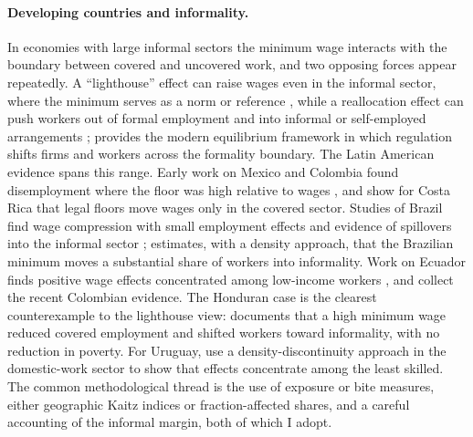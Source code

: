 \paragraph{Developing countries and informality.} In economies with large informal sectors the minimum wage interacts with the boundary between covered and uncovered work, and two opposing forces appear repeatedly. A ``lighthouse'' effect can raise wages even in the informal sector, where the minimum serves as a norm or reference \citep{lemos_2009, bosch_manacorda_2010, maloney_nunez_2004}, while a reallocation effect can push workers out of formal employment and into informal or self-employed arrangements \citep{ham_2018_honduras}; \citet{ulyssea_2018} provides the modern equilibrium framework in which regulation shifts firms and workers across the formality boundary. The Latin American evidence spans this range. Early work on Mexico and Colombia found disemployment where the floor was high relative to wages \citep{bell_1997}, and \citet{gindling_terrell_2007} show for Costa Rica that legal floors move wages only in the covered sector. Studies of Brazil find wage compression with small employment effects and evidence of spillovers into the informal sector \citep{lemos_2009, lemos_2004}; \citet{jales_2018} estimates, with a density approach, that the Brazilian minimum moves a substantial share of workers into informality. Work on Ecuador finds positive wage effects concentrated among low-income workers \citep{wong_2019_ecuador}, and \citet{arango_2022_colombia} collect the recent Colombian evidence. The Honduran case is the clearest counterexample to the lighthouse view: \citet{ham_2018_honduras} documents that a high minimum wage reduced covered employment and shifted workers toward informality, with no reduction in poverty. For Uruguay, \citet{katzkowicz_2021_uruguay} use a density-discontinuity approach in the domestic-work sector to show that effects concentrate among the least skilled. The common methodological thread is the use of exposure or bite measures, either geographic Kaitz indices or fraction-affected shares, and a careful accounting of the informal margin, both of which I adopt.

